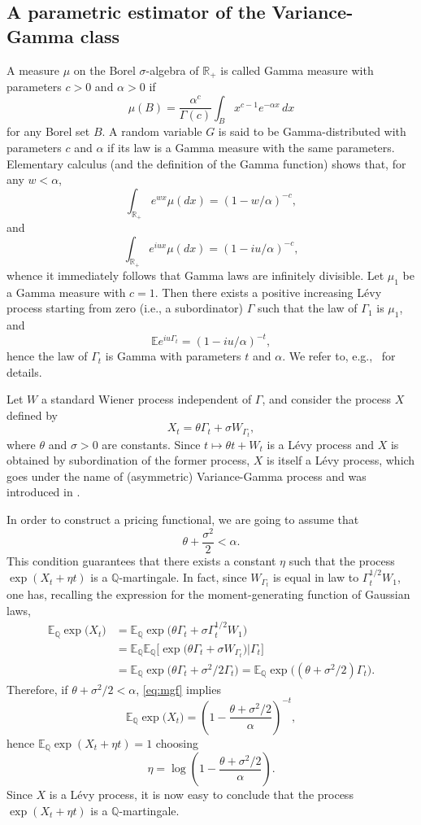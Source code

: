 \documentclass[11pt]{article}
\theoremstyle{remark}
\newcommand{\E}{\mathbb{E}}
\newcommand{\Q}{\mathbb{Q}}
\newcommand{\erre}{\mathbb{R}}
\begin{document}
\subsection{A parametric estimator of the Variance-Gamma class}
\label{ssec:VG}
A measure $\mu$ on the Borel $\sigma$-algebra of $\erre_+$ is called
Gamma measure with parameters $c>0$ and $\alpha>0$ if
\[
\mu(B) = \frac{\alpha^c}{\Gamma(c)} \int_B x^{c-1} e^{-\alpha x}\,dx
\]
for any Borel set $B$. A random variable $G$ is said to be
Gamma-distributed with parameters $c$ and $\alpha$ if its law is a
Gamma measure with the same parameters. Elementary calculus (and the
definition of the Gamma function) shows that, for any $w<\alpha$,
\begin{equation}
  \label{eq:mgf}
  \int_{\erre_+} e^{wx} \mu(dx) = (1 - w/\alpha)^{-c},  
\end{equation}
and
\[
\int_{\erre_+} e^{iux} \mu(dx) = (1 - iu/\alpha)^{-c},
\]
whence it immediately follows that Gamma laws are infinitely
divisible. Let $\mu_1$ be a Gamma measure with $c=1$. Then there
exists a positive increasing L\'evy process starting from zero (i.e.,
a subordinator) $\Gamma$ such that the law of $\Gamma_1$ is $\mu_1$,
and
\[
\E e^{iu\Gamma_t} = (1 - iu/\alpha)^{-t},
\]
hence the law of $\Gamma_t$ is Gamma with parameters $t$ and
$\alpha$. We refer to, e.g.,~\cite{Sato} for details.

Let $W$ a standard Wiener process independent of $\Gamma$, and
consider the process $X$ defined by
\[
X_t = \theta \Gamma_t + \sigma W_{\Gamma_t},
\]
where $\theta$ and $\sigma>0$ are constants. Since
$t \mapsto \theta t+ W_t$ is a L\'evy process and $X$ is obtained by
subordination of the former process, $X$ is itself a L\'evy process,
which goes under the name of (asymmetric) Variance-Gamma process and
was introduced in \cite{MCC}.

In order to construct a pricing functional, we are going to assume
that
\[
\theta + \frac{\sigma^2}{2} < \alpha.
\]
This condition guarantees that there exists a constant $\eta$ such
that the process $\exp(X_t + \eta t)$ is a
$\Q$-martingale.  In fact, since $W_{\Gamma_t}$ is equal in law to
$\Gamma_t^{1/2}W_1$, one has, recalling the expression for the
moment-generating function of Gaussian laws,
\begin{align*}
\E_\Q \exp\bigl(X_t\bigr) &= \E_\Q \exp\bigl(
\theta \Gamma_t + \sigma \Gamma_t^{1/2}W_1 \bigr)\\
&= \E_\Q \E_\Q\bigl[\exp\bigl(
\theta \Gamma_t + \sigma W_{\Gamma_t} \bigr) \big\vert \Gamma_t \bigr]\\
&= \E_\Q \exp\bigl( \theta\Gamma_t + \sigma^2/2 \Gamma_t \bigr)
= \E_\Q \exp\bigl( (\theta+ \sigma^2/2) \Gamma_t \bigr).
\end{align*}
Therefore, if $\theta+\sigma^2/2 < \alpha$, \eqref{eq:mgf} implies
\[
\E_\Q \exp\bigl(X_t\bigr) = \left(
1 - \frac{\theta+\sigma^2/2}{\alpha} \right)^{-t},
\]
hence $\E_\Q \exp(X_t+\eta t) = 1$ choosing
\[
\eta = \log \left( 1 - \frac{\theta+\sigma^2/2}{\alpha} \right).
\]
Since $X$ is a L\'evy process, it is now easy to conclude that the
process $\exp(X_t+\eta t)$ is a $\Q$-martingale.
\end{document}
